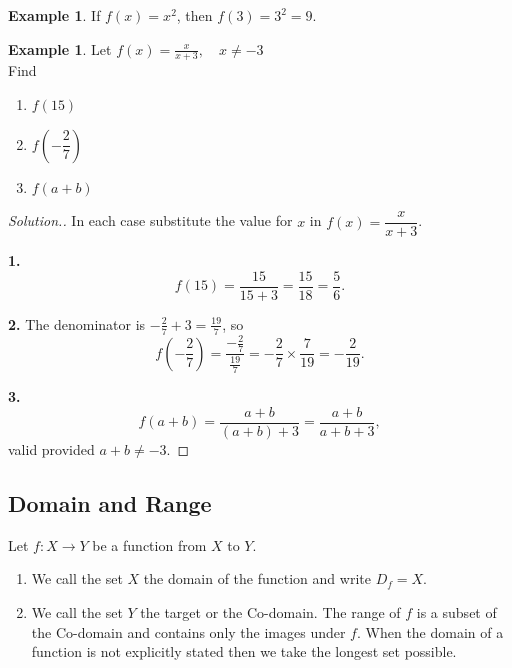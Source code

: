 \documentclass[11pt,a4paper]{article}
\theoremstyle{definition}
\newtheorem{example}[thm]{Example}
\newenvironment{solution}
  {\renewcommand{\qedsymbol}{}\begin{proof}[\textit{Solution}.]}
  {\end{proof}}
\begin{document}
\begin{example}
If $f(x)=x^{2}$, then $f(3)=3^{2}=9$.
\end{example}
\begin{example}

Let $f(x)=\frac{x}{x+3},\quad  x\neq -3$\\

Find 
\begin{enumerate}
\item $f(15)$
\item $f\left(-\dfrac{2}{7}\right)$
\item $f(a+b)$\\
\end{enumerate}
\end{example}
\begin{solution}

In each case substitute the value for $x$ in $f(x)=\dfrac{x}{x+3}$.

\textbf{1.}
$$f(15)=\frac{15}{15+3}=\frac{15}{18}=\frac{5}{6}.$$

\textbf{2.} The denominator is $-\frac{2}{7}+3=\frac{19}{7}$, so
$$f\left(-\frac{2}{7}\right)
=\frac{-\frac{2}{7}}{\frac{19}{7}}
=-\frac{2}{7}\times\frac{7}{19}
=-\frac{2}{19}.$$

\textbf{3.}
$$f(a+b)=\frac{a+b}{(a+b)+3}=\frac{a+b}{a+b+3},$$
valid provided $a+b\neq-3$.
\end{solution}
\pagebreak
\subsection{Domain and Range}
Let $f:X\longrightarrow Y$ be a function from $X$ to $Y$.
\begin{enumerate}
\item We call the set $X$ the domain of the function and write $D_f=X$.
\item We call the set $Y$ the target or the Co-domain. The range of $f$ is a subset of the Co-domain and contains only the images under $f$. When the domain of a function is not explicitly stated then we take the longest set possible.\\
\end{enumerate}
\end{document}
